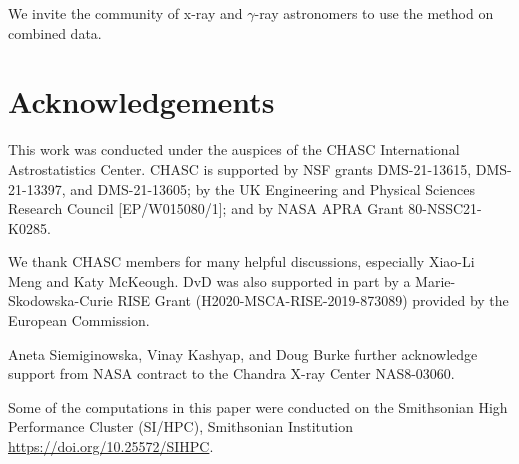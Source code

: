 \documentclass[twocolumn]{aastex631}
\newcommand{\gammaray}{$\gamma$-ray\xspace}
\begin{document}
    We invite the community of x-ray and \gammaray astronomers to use the method on combined data. 

    \section*{Acknowledgements}
    This work was conducted under the auspices of the CHASC International Astrostatistics Center.
    CHASC is supported by NSF grants DMS-21-13615, DMS-21-13397, and DMS-21-13605; by the UK Engineering
    and Physical Sciences Research Council [EP/W015080/1]; and by NASA APRA Grant 80-NSSC21-K0285.
    
    We thank CHASC members for many helpful discussions, especially Xiao-Li Meng and Katy McKeough.
    DvD was also supported in part by a Marie-Skodowska-Curie RISE Grant (H2020-MSCA-RISE-2019-873089)
    provided by the European Commission.
    
    Aneta Siemiginowska, Vinay Kashyap, and Doug Burke further acknowledge support from NASA
    contract to the Chandra X-ray Center NAS8-03060.

    Some of the computations in this paper were conducted on the Smithsonian High Performance
    Cluster (SI/HPC), Smithsonian Institution \url{https://doi.org/10.25572/SIHPC}.

    \newpage
    
\end{document}
